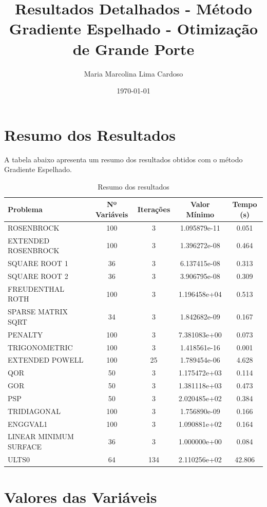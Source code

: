 \documentclass[12pt]{article}
\title{Resultados Detalhados - Método Gradiente Espelhado - Otimização de Grande Porte}
\author{Maria Marcolina Lima Cardoso}
\date{\today}
\begin{document}
\maketitle

\section{Resumo dos Resultados}

A tabela abaixo apresenta um resumo dos resultados obtidos com o método Gradiente Espelhado.

\begin{table}[h!]
\centering
\caption{Resumo dos resultados}
\label{tab:resumo}
\begin{tabular}{@{}lcccc@{}}
\toprule
\textbf{Problema} & \textbf{Nº Variáveis} & \textbf{Iterações} & \textbf{Valor Mínimo} & \textbf{Tempo (s)} \\
\midrule
ROSENBROCK & 100 & 3 & 1.095879e-11 & 0.051 \\
EXTENDED ROSENBROCK & 100 & 3 & 1.396272e-08 & 0.464 \\
SQUARE ROOT 1 & 36 & 3 & 6.137415e-08 & 0.313 \\
SQUARE ROOT 2 & 36 & 3 & 3.906795e-08 & 0.309 \\
FREUDENTHAL ROTH & 100 & 3 & 1.196458e+04 & 0.513 \\
SPARSE MATRIX SQRT & 34 & 3 & 1.842682e-09 & 0.167 \\
PENALTY & 100 & 3 & 7.381083e+00 & 0.073 \\
TRIGONOMETRIC & 100 & 3 & 1.418561e-16 & 0.001 \\
EXTENDED POWELL & 100 & 25 & 1.789454e-06 & 4.628 \\
QOR & 50 & 3 & 1.175472e+03 & 0.114 \\
GOR & 50 & 3 & 1.381118e+03 & 0.473 \\
PSP & 50 & 3 & 2.020485e+02 & 0.384 \\
TRIDIAGONAL & 100 & 3 & 1.756890e-09 & 0.166 \\
ENGGVAL1 & 100 & 3 & 1.090881e+02 & 0.164 \\
LINEAR MINIMUM SURFACE & 36 & 3 & 1.000000e+00 & 0.084 \\
ULTS0 & 64 & 134 & 2.110256e+02 & 42.806 \\

\bottomrule
\end{tabular}
\end{table}

\section{Valores das Variáveis}
\end{document}
